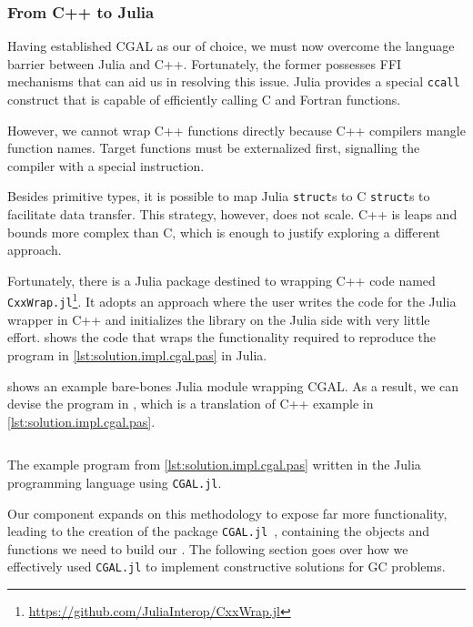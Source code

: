 \subsubsection{From C++ to Julia}%
\label{sec:solution.impl.jlcgal}

Having established \ac{CGAL} as our \geomlibrary{} of choice, we must now
overcome the language barrier between Julia and C++.  Fortunately, the former
possesses \ac{FFI} mechanisms that can aid us in resolving this issue.  Julia
provides a special \texttt{ccall} construct that is capable of
efficiently calling C and Fortran functions.

However, we cannot wrap C++ functions directly because C++ compilers mangle
function names.  Target functions must be externalized first, signalling the
compiler with a special instruction.

Besides primitive types, it is possible to map Julia \texttt{struct}s
to C \texttt{struct}s to facilitate data transfer.  This strategy,
however, does not scale.  C++ is leaps and bounds more complex than C, which is
enough to justify exploring a different approach.

Fortunately, there is a Julia package destined to wrapping C++ code named
\texttt{CxxWrap.jl}\footnote{\url{https://github.com/JuliaInterop/CxxWrap.jl}}.
It adopts an approach where the user writes the code for the Julia wrapper in
C++ and initializes the library on the Julia side with very little effort.
 shows the code that wraps the
functionality required to reproduce the program in
\cref{lst:solution.impl.cgal.pas} in Julia.

 shows an example bare-bones Julia module
wrapping \ac{CGAL}.  As a result, we can devise the program in
, which is a translation of C++ example in
\cref{lst:solution.impl.cgal.pas}.

\begin{listing}[htbp]
  \inputminted{julia}{jl/points_and_segments.jl}
  \caption{\label{lst:solution.impl.jlcgal.pas}
    The example program from \cref{lst:solution.impl.cgal.pas} written in the
    Julia programming language using \texttt{CGAL.jl}.}%
\end{listing}

Our \wrapper{} component expands on this methodology to expose far more
functionality, leading to the creation of the package
\texttt{CGAL.jl}~\cite{Ventura:2021:CGAL.jl},  containing the objects and
functions we need to build our \primitives{}.  The following section goes over
how we effectively used \texttt{CGAL.jl} to implement constructive solutions for
\ac{GC} problems.
